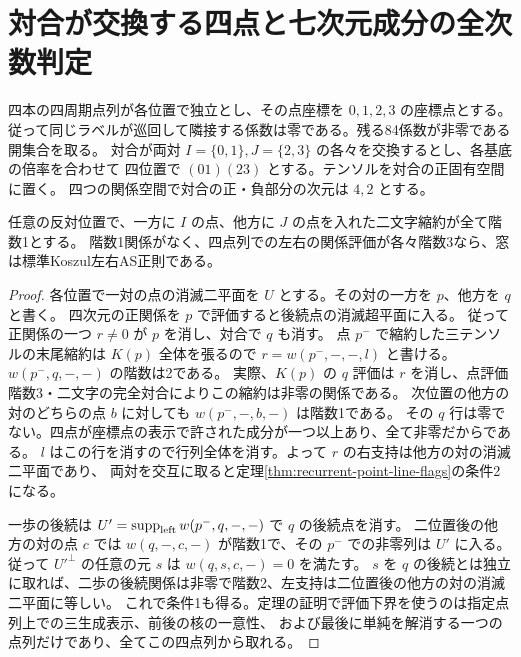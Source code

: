 \section{対合が交換する四点と七次元成分の全次数判定}
\label{sec:involution-quartet-component}
四本の四周期点列が各位置で独立とし、その点座標を $0,1,2,3$ の座標点とする。
従って同じラベルが巡回して隣接する係数は零である。残る84係数が非零である開集合を取る。
対合が両対 $I=\{0,1\},J=\{2,3\}$ の各々を交換するとし、各基底の倍率を合わせて
四位置で $(01)(23)$ とする。テンソルを対合の正固有空間に置く。
四つの関係空間で対合の正・負部分の次元は $4,2$ とする。

\begin{lemma}\label{lem:four-track-opposite-minors}
任意の反対位置で、一方に $I$ の点、他方に $J$ の点を入れた二文字縮約が全て階数1とする。
階数1関係がなく、四点列での左右の関係評価が各々階数3なら、窓は標準Koszul左右AS正則である。
\end{lemma}
\begin{proof}
各位置で一対の点の消滅二平面を $U$ とする。その対の一方を $p$、他方を $q$ と書く。
四次元の正関係を $p$ で評価すると後続点の消滅超平面に入る。
従って正関係の一つ $r\ne0$ が $p$ を消し、対合で $q$ も消す。
点 $p^-$ で縮約した三テンソルの末尾縮約は $K(p)$ 全体を張るので
$r=w(p^-,-,-,l)$ と書ける。$w(p^-,q,-,-)$ の階数は2である。
実際、$K(p)$ の $q$ 評価は $r$ を消し、点評価階数3・二文字の完全対合によりこの縮約は非零の関係である。
次位置の他方の対のどちらの点 $b$ に対しても $w(p^-,-,b,-)$ は階数1である。
その $q$ 行は零でない。四点が座標点の表示で許された成分が一つ以上あり、全て非零だからである。
$l$ はこの行を消すので行列全体を消す。よって $r$ の右支持は他方の対の消滅二平面であり、
両対を交互に取ると定理\ref{thm:recurrent-point-line-flags}の条件2になる。

一歩の後続は $U'=\operatorname{supp}_{\rm left}w(p^-,q,-,-)$ で $q$ の後続点を消す。
二位置後の他方の対の点 $c$ では $w(q,-,c,-)$ が階数1で、その $p^-$ での非零列は $U'$ に入る。
従って $U'^\perp$ の任意の元 $s$ は $w(q,s,c,-)=0$ を満たす。
$s$ を $q$ の後続とは独立に取れば、二歩の後続関係は非零で階数2、左支持は二位置後の他方の対の消滅二平面に等しい。
これで条件1も得る。定理の証明で評価下界を使うのは指定点列上での三生成表示、前後の核の一意性、
および最後に単純を解消する一つの点列だけであり、全てこの四点列から取れる。
\end{proof}

